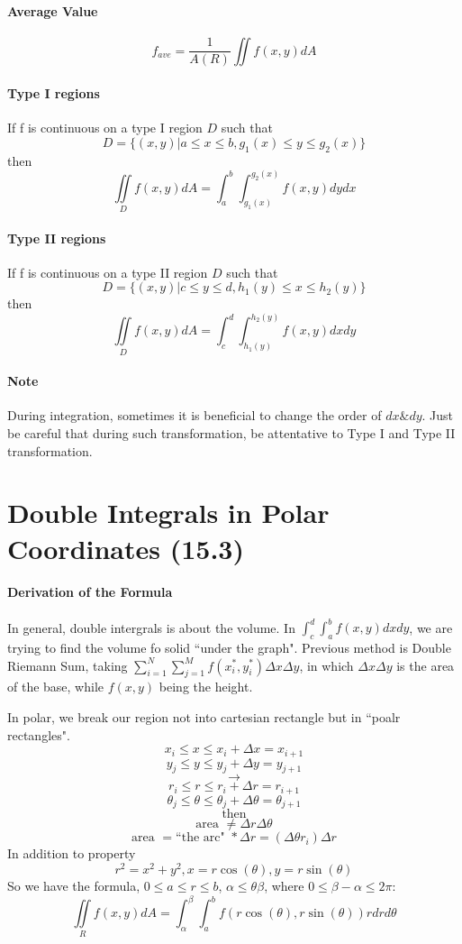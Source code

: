 \documentclass[11pt, oneside]{article}   	%
\begin{document}
\paragraph{Average Value} $$f_{ave} = \frac{1}{A(R)}\iint f(x,y)dA$$
\paragraph{Type I regions}
If f is continuous on a type I region $D$ such that $$D = \{(x,y)|a\le x\le b, g_1(x)\le y \le g_2(x)\}$$ then $$ \iint \limits_D f(x,y) dA = \int_a^b \int_{g_1(x)}^{g_2(x)} f(x,y) dy dx$$
\paragraph{Type II regions}
If f is continuous on a type II region $D$ such that $$D = \{(x,y)|c\le y\le d, h_1(y)\le x \le h_2(y)\}$$ then $$ \iint \limits_D f(x,y) dA = \int_c^d \int_{h_1(y)}^{h_2(y)} f(x,y) dx dy$$
\paragraph{Note}
During integration, sometimes it is beneficial to change the order of $dx \& dy$. Just be careful that during such transformation, be attentative to Type I and Type II transformation.

\section{Double Integrals in Polar Coordinates (15.3)}
\paragraph{Derivation of the Formula}
In general, double intergrals is about the volume. In $\int_c^d\int_a^b f(x,y)dxdy$, we are trying to find the volume fo solid ``under the graph".
Previous method is Double Riemann Sum, taking $\sum_{i=1}^N\sum_{j=1}^M f(x_i^\ast, y_i^\ast)\Delta x \Delta y$, in which $\Delta x \Delta y$ is the area of the base, while $f(x,y)$ being the height.
\par
In polar, we break our region not into cartesian rectangle but in ``poalr rectangles".
$$x_i \leq x \leq x_i + \Delta x = x_{i+1}$$
$$y_j \leq y \leq y_j + \Delta y = y_{j+1}$$
$$\to$$
$$r_i \leq r \leq r_i + \Delta r = r_{i+1}$$
$$\theta_j \leq \theta \leq \theta_j + \Delta \theta = \theta_{j+1}$$
$$\text{then}$$
$$\text{area } \neq \Delta r \Delta \theta$$
$$\text{area } = \text{``the arc" } * \Delta r = (\Delta \theta r_i)\Delta r$$
In addition to property $$r^2 = x^2 + y^2, x = r\cos(\theta), y = r\sin(\theta)$$
So we have the formula, $0\leq a \leq r \leq b$, $\alpha \leq \theta \beta$, where $0 \leq \beta - \alpha \leq 2\pi$:
$$\iint \limits_R f(x,y) dA = \int_\alpha^\beta \int_a^b f(r \cos(\theta),r\sin(\theta))r dr d\theta$$
\end{document}
